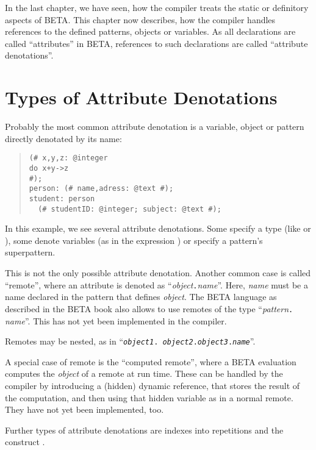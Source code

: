 In the last chapter, we have seen, how the compiler treats the
static or definitory aspects of BETA.  This chapter now
describes, how the compiler handles references to the defined
patterns, objects or variables.  As all declarations are
called ``attributes'' in BETA, references to such declarations
are called ``attribute denotations''.

\section{Types of Attribute Denotations}
Probably the most common attribute denotation is a variable,
object or pattern directly denotated by its name:
\begin{quote}\begin{verbatim}(# x,y,z: @integer
do x+y->z
#);
person: (# name,adress: @text #);
student: person
  (# studentID: @integer; subject: @text #);
\end{verbatim}\end{quote}
In this example, we see several attribute denotations.  Some
specify a type (like  or ), some denote
variables (as in the expression ) or specify a
pattern's superpattern.

This is not the only possible attribute denotation.  Another
common case is called ``remote'', where an attribute is denoted
as ``{\it object\/}{\tt .}{\it name\/}''.  Here, {\it name\/}
must be a name declared in the pattern that defines {\it
object\/}.  The BETA language as described in the BETA book also
allows to use remotes of the type ``{\it pattern\/}{\tt .}{\it
name\/}''.  This has not yet been implemented in the compiler.

Remotes may be nested, as in ``{\tt {\it object1\/}.{\it
object2\/}.{\it object3\/}.{\it name\/}}''.

A special case of remote is the ``computed remote'', where a BETA
evaluation computes the {\it object\/} of a remote at run time.
These can be handled by the compiler by introducing a (hidden)
dynamic reference, that stores the result of the computation, and
then using that hidden variable as in a normal remote.  They have
not yet been implemented, too.

Further types of attribute denotations are indexes into
repetitions and the construct .
